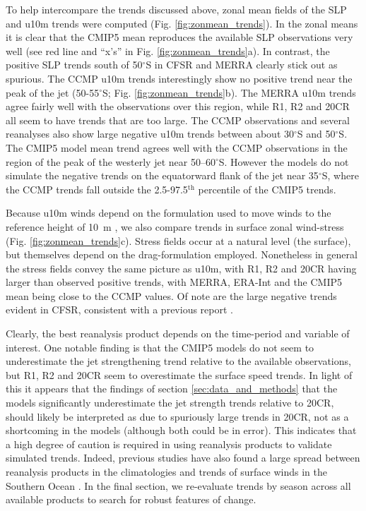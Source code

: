 \documentclass{ametsoc}
\begin{document}
To help intercompare the trends discussed above, zonal mean fields of the SLP and u10m trends were
computed (Fig. \ref{fig:zonmean_trends}). In the zonal means it is clear that the CMIP5 mean reproduces
the available SLP observations very well (see red line and ``x's'' in Fig. \ref{fig:zonmean_trends}a). 
In contrast, the positive SLP trends south of 50$^{\circ}$S in
CFSR and MERRA clearly stick out as spurious. The CCMP u10m trends interestingly show no positive
trend near the peak of the jet (50-55$^{\circ}$S; Fig. \ref{fig:zonmean_trends}b). The MERRA u10m 
trends agree fairly well with the
observations over this region, while R1, R2 and 20CR all seem to have trends that are too large.
The CCMP observations and several reanalyses also show large negative u10m trends between about 
30$^{\circ}$S and 50$^{\circ}$S. The CMIP5 model mean trend agrees well with the CCMP observations
in the region of the peak of the westerly jet near 50--60$^{\circ}$S. However the models do not
simulate the negative trends on the equatorward flank of the jet near 35$^{\circ}$S, where the CCMP 
trends fall outside the 2.5-97.5$^\textrm{th}$ percentile of the CMIP5 trends.

Because u10m winds depend on the formulation used to move winds to the reference height of 10~m
\citep{Kent_et_al_2013}, we also compare trends in surface zonal wind-stress
(Fig. \ref{fig:zonmean_trends}c). Stress fields occur at a natural level (the surface), 
but themselves depend on the drag-formulation employed. Nonetheless in general the stress fields 
convey the same picture as u10m, with R1, R2 and 20CR having
larger than observed positive trends, with MERRA, ERA-Int and the CMIP5 mean being close to the CCMP values. 
Of note are the large negative trends evident in CFSR, consistent with a previous report 
\citep{Swart_et_al_2014}.

Clearly, the best reanalysis product depends on the time-period and variable of interest. One notable
finding is that the CMIP5 models do not seem to underestimate the jet strengthening trend relative to
the available observations, but R1, R2 and 20CR seem to overestimate the surface speed trends. In light
of this it appears that the findings of section \ref{sec:data_and_methods} that the models significantly
underestimate the jet strength trends relative to 20CR, should likely be interpreted as due to 
spuriously large trends in 20CR, not as a shortcoming in the models (although both could be in error). 
This indicates that a high degree 
of caution is required in using reanalysis products to validate simulated trends. Indeed, previous studies
have also found a large spread between reanalysis products in the climatologies and 
trends of surface winds in the Southern Ocean \citep{Kent_et_al_2013, Li_et_al_2013}. In the final
section, we re-evaluate trends by season across all available products to search for robust
features of change.
\end{document}
